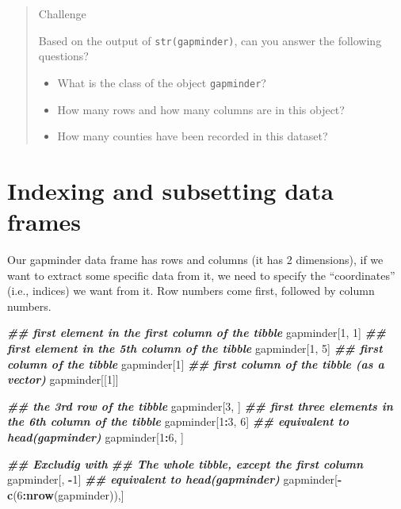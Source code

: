 \documentclass[
]{book}
\newenvironment{Shaded}{\begin{snugshade}}{\end{snugshade}}
\newcommand{\DecValTok}[1]{\textcolor[rgb]{0.00,0.00,0.81}{#1}}
\newcommand{\DocumentationTok}[1]{\textcolor[rgb]{0.56,0.35,0.01}{\textbf{\textit{#1}}}}
\newcommand{\FunctionTok}[1]{\textcolor[rgb]{0.13,0.29,0.53}{\textbf{#1}}}
\newcommand{\NormalTok}[1]{#1}
\newcommand{\SpecialCharTok}[1]{\textcolor[rgb]{0.81,0.36,0.00}{\textbf{#1}}}
\providecommand{\tightlist}{%
  \setlength{\itemsep}{0pt}\setlength{\parskip}{0pt}}
\begin{document}
\begin{quote}
Challenge

Based on the output of \texttt{str(gapminder)}, can you answer the following questions?

\begin{itemize}
\tightlist
\item
  What is the class of the object \texttt{gapminder}?
\item
  How many rows and how many columns are in this object?
\item
  How many counties have been recorded in this dataset?
\end{itemize}
\end{quote}

\section{Indexing and subsetting data frames}\label{indexing-and-subsetting-data-frames-1}

Our gapminder data frame has rows and columns (it has 2 dimensions), if we want to
extract some specific data from it, we need to specify the ``coordinates'' (i.e., indices) we want from it. Row numbers come first, followed by column numbers.

\begin{Shaded}
\begin{Highlighting}[]
\DocumentationTok{\#\# first element in the first column of the tibble}
\NormalTok{gapminder[}\DecValTok{1}\NormalTok{, }\DecValTok{1}\NormalTok{]}
\DocumentationTok{\#\# first element in the 5th column of the tibble }
\NormalTok{gapminder[}\DecValTok{1}\NormalTok{, }\DecValTok{5}\NormalTok{]}
\DocumentationTok{\#\# first column of the tibble}
\NormalTok{gapminder[}\DecValTok{1}\NormalTok{]}
\DocumentationTok{\#\# first column of the tibble (as a vector)}
\NormalTok{gapminder[[}\DecValTok{1}\NormalTok{]]}

\DocumentationTok{\#\# the 3rd row of the tibble}
\NormalTok{gapminder[}\DecValTok{3}\NormalTok{, ]}
\DocumentationTok{\#\# first three elements in the 6th column of the tibble}
\NormalTok{gapminder[}\DecValTok{1}\SpecialCharTok{:}\DecValTok{3}\NormalTok{, }\DecValTok{6}\NormalTok{]}
\DocumentationTok{\#\# equivalent to head(gapminder) }
\NormalTok{gapminder[}\DecValTok{1}\SpecialCharTok{:}\DecValTok{6}\NormalTok{, ]}

\DocumentationTok{\#\# Excludig with \textquotesingle{}{-}\textquotesingle{}}
\DocumentationTok{\#\# The whole tibble, except the first column}
\NormalTok{gapminder[, }\SpecialCharTok{{-}}\DecValTok{1}\NormalTok{]          }
\DocumentationTok{\#\# equivalent to head(gapminder)  }
\NormalTok{gapminder[}\SpecialCharTok{{-}}\FunctionTok{c}\NormalTok{(}\DecValTok{6}\SpecialCharTok{:}\FunctionTok{nrow}\NormalTok{(gapminder)),]}
\end{Highlighting}
\end{Shaded}
\end{document}
